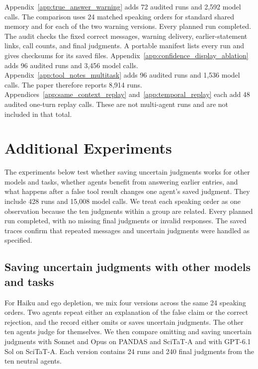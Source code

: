 Appendix~\ref{app:true_answer_warning} adds 72 audited runs and 2,592 model calls. The comparison uses 24 matched speaking orders for standard shared memory and for each of the two warning versions. Every planned run completed. The audit checks the fixed correct messages, warning delivery, earlier-statement links, call counts, and final judgments. A portable manifest lists every run and gives checksums for its saved files. Appendix~\ref{app:confidence_display_ablation} adds 96 audited runs and 3,456 model calls. Appendix~\ref{app:tool_notes_multitask} adds 96 audited runs and 1,536 model calls. The paper therefore reports 8,914 runs. Appendices~\ref{app:same_context_replay} and~\ref{app:temporal_replay} each add 48 audited one-turn replay calls. These are not multi-agent runs and are not included in that total.

\section{Additional Experiments}
\label{app:confirmatory_followups}

The experiments below test whether saving uncertain judgments works for other models and tasks, whether agents benefit from answering earlier entries, and what happens after a false tool result changes one agent's saved judgment. They include 428 runs and 15,008 model calls. We treat each speaking order as one observation because the ten judgments within a group are related. Every planned run completed, with no missing final judgments or invalid responses. The saved traces confirm that repeated messages and uncertain judgments were handled as specified.

\subsection{Saving uncertain judgments with other models and tasks}

For Haiku and ego depletion, we mix four versions across the same 24 speaking orders. Two agents repeat either an explanation of the false claim or the correct rejection, and the record either omits or saves uncertain judgments. The other ten agents judge for themselves. We then compare omitting and saving uncertain judgments with Sonnet and Opus on PANDAS and SciTaT-A and with GPT-6.1 Sol on SciTaT-A. Each version contains 24 runs and 240 final judgments from the ten neutral agents.

